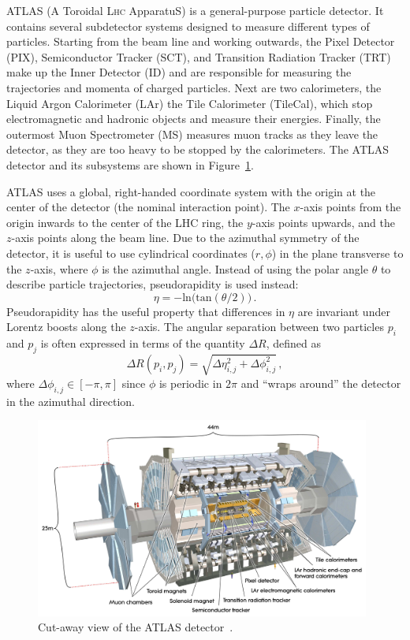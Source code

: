 ﻿ATLAS (A Toroidal L{\scshape hc} ApparatuS) is a general-purpose particle detector.
It contains several subdetector systems designed to measure different types of particles.
Starting from the beam line and working outwards, the Pixel Detector (PIX), Semiconductor Tracker (SCT), and Transition Radiation Tracker (TRT) make up the Inner Detector (ID) and are responsible for measuring the trajectories and momenta of charged particles.
Next are two calorimeters, the Liquid Argon Calorimeter (LAr) the Tile Calorimeter (TileCal), which stop electromagnetic and hadronic objects and measure their energies.
Finally, the outermost Muon Spectrometer (MS) measures muon tracks as they leave the detector, as they are too heavy to be stopped by the calorimeters.
The ATLAS detector and its subsystems are shown in Figure~\ref{fig:atlas}.

ATLAS uses a global, right-handed coordinate system with the origin at the center of the detector (the nominal interaction point).
The $x$-axis points from the origin inwards to the center of the LHC ring, the $y$-axis points upwards, and the $z$-axis points along the beam line.
Due to the azimuthal symmetry of the detector, it is useful to use cylindrical coordinates ($r,\phi$) in the plane transverse to the $z$-axis, where $\phi$ is the azimuthal angle.
Instead of using the polar angle $\theta$ to describe particle trajectories, pseudorapidity is used instead: %
\begin{equation}
  \eta = -\mathrm{ln}\big(\mathrm{tan}(\theta/2)\big)\,.
  \label{eq:eta}
\end{equation}
Pseudorapidity has the useful property that differences in $\eta$ are invariant under Lorentz boosts along the $z$-axis.
The angular separation between two particles $p_i$ and $p_j$ is often expressed in terms of the quantity $\Delta R$, defined as
\begin{equation}
  \Delta R(p_i,p_j) = \sqrt{\Delta\eta_{i,j}^2 + \Delta\phi_{i,j}^2}\,,
  \label{eq:deltar}
\end{equation}
where $\Delta\phi_{i,j} \in [-\pi,\pi]$ since $\phi$ is periodic in $2\pi$ and ``wraps around'' the detector in the azimuthal direction.

\begin{figure}[tbp]
  \begin{center}
    \includegraphics[width=0.98\textwidth]{figs/detector/atlas.pdf}
  \end{center}
  \caption[Cut-away view of the ATLAS detector.]{Cut-away view of the ATLAS detector~\cite{PERF-2007-01}.}
  \label{fig:atlas}
\end{figure}
